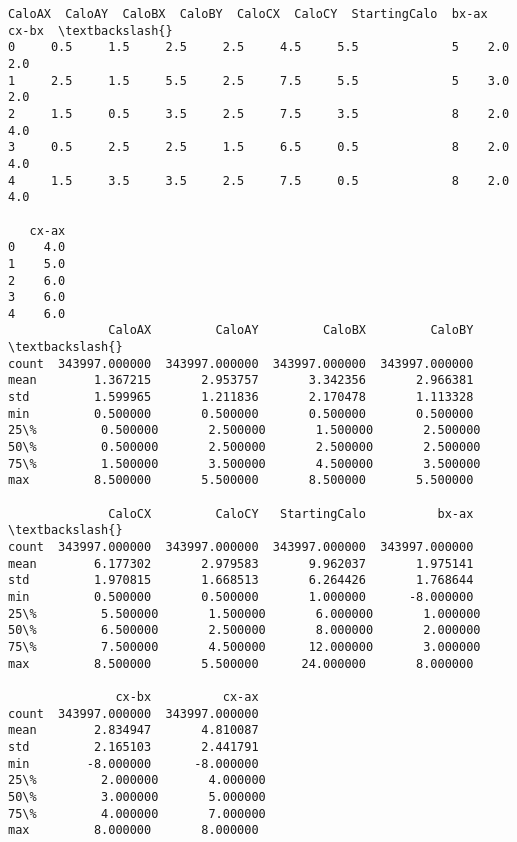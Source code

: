 \documentclass[11pt]{article}
\begin{document}
    \begin{Verbatim}[commandchars=\\\{\}]
   CaloAX  CaloAY  CaloBX  CaloBY  CaloCX  CaloCY  StartingCalo  bx-ax  cx-bx  \textbackslash{}
0     0.5     1.5     2.5     2.5     4.5     5.5             5    2.0    2.0   
1     2.5     1.5     5.5     2.5     7.5     5.5             5    3.0    2.0   
2     1.5     0.5     3.5     2.5     7.5     3.5             8    2.0    4.0   
3     0.5     2.5     2.5     1.5     6.5     0.5             8    2.0    4.0   
4     1.5     3.5     3.5     2.5     7.5     0.5             8    2.0    4.0   

   cx-ax  
0    4.0  
1    5.0  
2    6.0  
3    6.0  
4    6.0  
              CaloAX         CaloAY         CaloBX         CaloBY  \textbackslash{}
count  343997.000000  343997.000000  343997.000000  343997.000000   
mean        1.367215       2.953757       3.342356       2.966381   
std         1.599965       1.211836       2.170478       1.113328   
min         0.500000       0.500000       0.500000       0.500000   
25\%         0.500000       2.500000       1.500000       2.500000   
50\%         0.500000       2.500000       2.500000       2.500000   
75\%         1.500000       3.500000       4.500000       3.500000   
max         8.500000       5.500000       8.500000       5.500000   

              CaloCX         CaloCY   StartingCalo          bx-ax  \textbackslash{}
count  343997.000000  343997.000000  343997.000000  343997.000000   
mean        6.177302       2.979583       9.962037       1.975141   
std         1.970815       1.668513       6.264426       1.768644   
min         0.500000       0.500000       1.000000      -8.000000   
25\%         5.500000       1.500000       6.000000       1.000000   
50\%         6.500000       2.500000       8.000000       2.000000   
75\%         7.500000       4.500000      12.000000       3.000000   
max         8.500000       5.500000      24.000000       8.000000   

               cx-bx          cx-ax  
count  343997.000000  343997.000000  
mean        2.834947       4.810087  
std         2.165103       2.441791  
min        -8.000000      -8.000000  
25\%         2.000000       4.000000  
50\%         3.000000       5.000000  
75\%         4.000000       7.000000  
max         8.000000       8.000000  

    \end{Verbatim}
\end{document}

